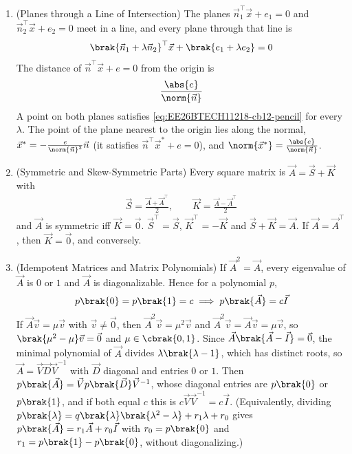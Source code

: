 \begin{enumerate}[label=\thesubsection.\arabic*, ref=\thesubsection.\theenumi,itemsep=1.5em]
\item (Planes through a Line of Intersection) The planes $\vec{n}_1^{\top}\vec{x}+e_1=0$ and $\vec{n}_2^{\top}\vec{x}+e_2=0$ meet in a line, and every plane through that line is
\begin{align}
\brak{\vec{n}_1+\lambda\vec{n}_2}^{\top}\vec{x} + \brak{e_1+\lambda e_2} = 0
\label{eq:EE26BTECH11218-cb12-pencil}
\end{align}
The distance of $\vec{n}^{\top}\vec{x}+e=0$ from the origin is
\begin{align}
\frac{\abs{e}}{\norm{\vec{n}}}
\label{eq:EE26BTECH11218-cb12-plane-dist}
\end{align}
\solution A point on both planes satisfies \eqref{eq:EE26BTECH11218-cb12-pencil} for every $\lambda$. The point of the plane nearest to the origin lies along the normal, $\vec{x}^{*}=-\frac{e}{\norm{\vec{n}}^2}\vec{n}$ (it satisfies $\vec{n}^{\top}\vec{x}^{*}+e=0$), and $\norm{\vec{x}^{*}}=\frac{\abs{e}}{\norm{\vec{n}}}$.

\item (Symmetric and Skew-Symmetric Parts) Every square matrix is $\vec{A}=\vec{S}+\vec{K}$ with
\begin{align}
\vec{S}=\frac{\vec{A}+\vec{A}^{\top}}{2}, \qquad \vec{K}=\frac{\vec{A}-\vec{A}^{\top}}{2}
\label{eq:EE26BTECH11218-cb12-symskew}
\end{align}
and $\vec{A}$ is symmetric iff $\vec{K}=\vec{0}$.
\solution $\vec{S}^{\top}=\vec{S}$, $\vec{K}^{\top}=-\vec{K}$ and $\vec{S}+\vec{K}=\vec{A}$. If $\vec{A}=\vec{A}^{\top}$, then $\vec{K}=\vec{0}$, and conversely.

\item (Idempotent Matrices and Matrix Polynomials) If $\vec{A}^2=\vec{A}$, every eigenvalue of $\vec{A}$ is $0$ or $1$ and $\vec{A}$ is diagonalizable. Hence for a polynomial $p$,
\begin{align}
p\brak{0}=p\brak{1}=c \implies p\brak{\vec{A}}=c\vec{I}
\label{eq:EE26BTECH11218-cb12-idem}
\end{align}
\solution If $\vec{A}\vec{v}=\mu\vec{v}$ with $\vec{v}\ne\vec{0}$, then $\vec{A}^2\vec{v}=\mu^2\vec{v}$ and $\vec{A}^2\vec{v}=\vec{A}\vec{v}=\mu\vec{v}$, so $\brak{\mu^2-\mu}\vec{v}=\vec{0}$ and $\mu\in\cbrak{0,1}$. Since $\vec{A}\brak{\vec{A}-\vec{I}}=\vec{0}$, the minimal polynomial of $\vec{A}$ divides $\lambda\brak{\lambda-1}$, which has distinct roots, so $\vec{A}=\vec{V}\vec{D}\vec{V}^{-1}$ with $\vec{D}$ diagonal and entries $0$ or $1$. Then $p\brak{\vec{A}}=\vec{V}p\brak{\vec{D}}\vec{V}^{-1}$, whose diagonal entries are $p\brak{0}$ or $p\brak{1}$, and if both equal $c$ this is $c\vec{V}\vec{V}^{-1}=c\vec{I}$. (Equivalently, dividing $p\brak{\lambda}=q\brak{\lambda}\brak{\lambda^2-\lambda}+r_1\lambda+r_0$ gives $p\brak{\vec{A}}=r_1\vec{A}+r_0\vec{I}$ with $r_0=p\brak{0}$ and $r_1=p\brak{1}-p\brak{0}$, without diagonalizing.)


\end{enumerate}
